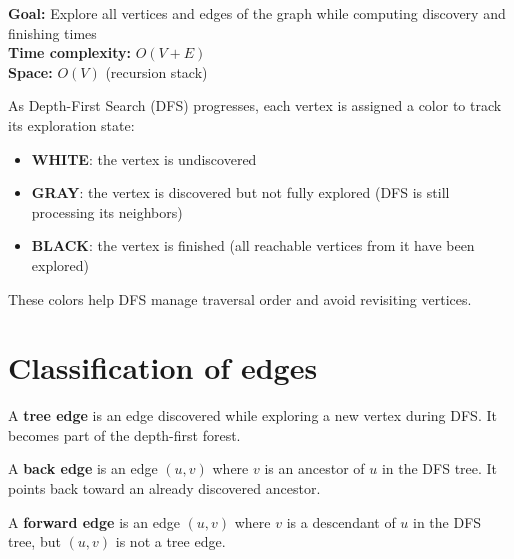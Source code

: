 \documentclass[11pt,a4paper,openany]{book}
\begin{document}
\textbf{Goal:} Explore all vertices and edges of the graph while computing discovery and finishing times \\

\textbf{Time complexity:} $O(V + E)$ \\

\textbf{Space:} $O(V)$ (recursion stack)

\begin{defnbox}[title=DFS Vertex Colors]
As Depth-First Search (DFS) progresses, each vertex is assigned a color to track its exploration state:

\begin{itemize}
    \item \textbf{WHITE}: the vertex is undiscovered
    \item \textbf{GRAY}: the vertex is discovered but not fully explored (DFS is still processing its neighbors)
    \item \textbf{BLACK}: the vertex is finished (all reachable vertices from it have been explored)
\end{itemize}

These colors help DFS manage traversal order and avoid revisiting vertices.
\end{defnbox}







\vspace{2cm}





\section{Classification of edges}

\begin{defnbox}[title=Tree Edge]
A \textbf{tree edge} is an edge discovered while exploring a new vertex during DFS.  
It becomes part of the depth-first forest.
\end{defnbox}

\begin{defnbox}[title=Back Edge]
A \textbf{back edge} is an edge $(u,v)$ where $v$ is an ancestor of $u$ in the DFS tree.  
It points back toward an already discovered ancestor.
\end{defnbox}

\begin{defnbox}[title=Forward Edge]
A \textbf{forward edge} is an edge $(u,v)$ where $v$ is a descendant of $u$ in the DFS tree, but $(u,v)$ is not a tree edge.
\end{defnbox}
\end{document}
